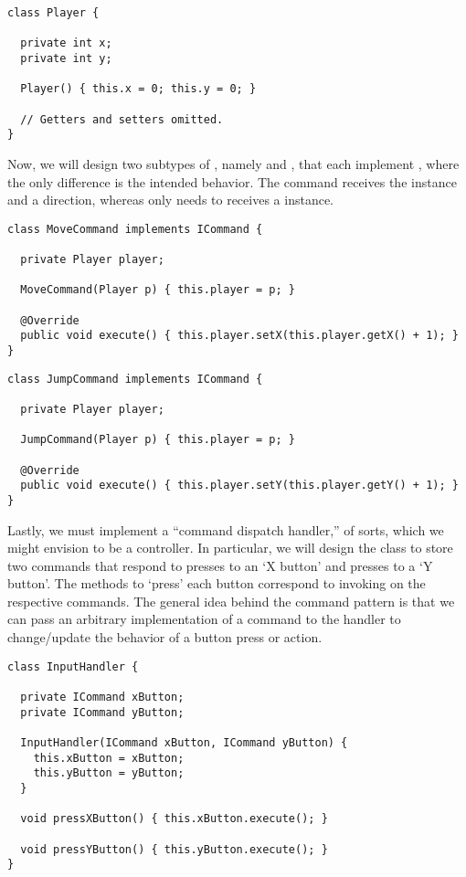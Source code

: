 \begin{lstlisting}[language=MyJava]
class Player {
  
  private int x;
  private int y;

  Player() { this.x = 0; this.y = 0; }

  // Getters and setters omitted.
}
\end{lstlisting}

Now, we will design two subtypes of , namely  and , that each implement , where the only difference is the intended behavior. 
The  command receives the  instance and a direction, whereas  only needs to receives a  instance. 

\begin{lstlisting}[language=MyJava]
class MoveCommand implements ICommand {

  private Player player;

  MoveCommand(Player p) { this.player = p; }

  @Override
  public void execute() { this.player.setX(this.player.getX() + 1); }
}
\end{lstlisting}

\begin{lstlisting}[language=MyJava]
class JumpCommand implements ICommand {
  
  private Player player;

  JumpCommand(Player p) { this.player = p; }

  @Override
  public void execute() { this.player.setY(this.player.getY() + 1); }
}
\end{lstlisting}

Lastly, we must implement a ``command dispatch handler,'' of sorts, which we might envision to be a controller. 
In particular, we will design the  class to store two commands that respond to presses to an `X button' and presses to a `Y button'. 
The methods to `press' each button correspond to invoking  on the respective commands. 
The general idea behind the command pattern is that we can pass an arbitrary implementation of a command to the handler to change/update the behavior of a button press or action. 

\begin{lstlisting}[language=MyJava]
class InputHandler {

  private ICommand xButton;
  private ICommand yButton;

  InputHandler(ICommand xButton, ICommand yButton) {
    this.xButton = xButton;
    this.yButton = yButton;
  }

  void pressXButton() { this.xButton.execute(); }

  void pressYButton() { this.yButton.execute(); }
}
\end{lstlisting}


